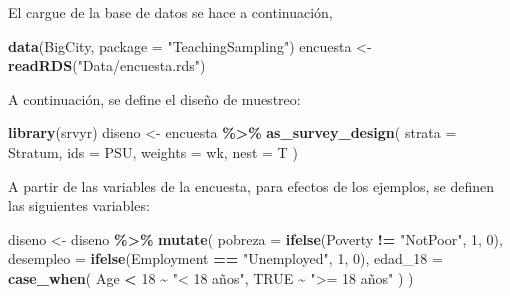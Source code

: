 \documentclass[
  spanish,
  12pt,
]{book}
\newenvironment{Shaded}{\begin{snugshade}}{\end{snugshade}}
\newcommand{\AttributeTok}[1]{\textcolor[rgb]{0.13,0.29,0.53}{#1}}
\newcommand{\ConstantTok}[1]{\textcolor[rgb]{0.56,0.35,0.01}{#1}}
\newcommand{\DecValTok}[1]{\textcolor[rgb]{0.00,0.00,0.81}{#1}}
\newcommand{\FunctionTok}[1]{\textcolor[rgb]{0.13,0.29,0.53}{\textbf{#1}}}
\newcommand{\NormalTok}[1]{#1}
\newcommand{\OtherTok}[1]{\textcolor[rgb]{0.56,0.35,0.01}{#1}}
\newcommand{\SpecialCharTok}[1]{\textcolor[rgb]{0.81,0.36,0.00}{\textbf{#1}}}
\newcommand{\StringTok}[1]{\textcolor[rgb]{0.31,0.60,0.02}{#1}}
\begin{document}
El cargue de la base de datos se hace a continuación,

\begin{Shaded}
\begin{Highlighting}[]
\FunctionTok{data}\NormalTok{(BigCity, }\AttributeTok{package =} \StringTok{"TeachingSampling"}\NormalTok{)}
\NormalTok{encuesta }\OtherTok{\textless{}{-}} \FunctionTok{readRDS}\NormalTok{(}\StringTok{"Data/encuesta.rds"}\NormalTok{)}
\end{Highlighting}
\end{Shaded}

A continuación, se define el diseño de muestreo:

\begin{Shaded}
\begin{Highlighting}[]
\FunctionTok{library}\NormalTok{(srvyr)}
\NormalTok{diseno }\OtherTok{\textless{}{-}}\NormalTok{ encuesta }\SpecialCharTok{\%\textgreater{}\%}
  \FunctionTok{as\_survey\_design}\NormalTok{(}
    \AttributeTok{strata =}\NormalTok{ Stratum,}
    \AttributeTok{ids =}\NormalTok{ PSU,}
    \AttributeTok{weights =}\NormalTok{ wk,}
    \AttributeTok{nest =}\NormalTok{ T}
\NormalTok{  )}
\end{Highlighting}
\end{Shaded}

A partir de las variables de la encuesta, para efectos de los ejemplos, se definen las siguientes variables:

\begin{Shaded}
\begin{Highlighting}[]
\NormalTok{diseno }\OtherTok{\textless{}{-}}\NormalTok{ diseno }\SpecialCharTok{\%\textgreater{}\%} \FunctionTok{mutate}\NormalTok{(}
  \AttributeTok{pobreza =} \FunctionTok{ifelse}\NormalTok{(Poverty }\SpecialCharTok{!=} \StringTok{"NotPoor"}\NormalTok{, }\DecValTok{1}\NormalTok{, }\DecValTok{0}\NormalTok{),}
  \AttributeTok{desempleo =} \FunctionTok{ifelse}\NormalTok{(Employment }\SpecialCharTok{==} \StringTok{"Unemployed"}\NormalTok{, }\DecValTok{1}\NormalTok{, }\DecValTok{0}\NormalTok{),}
  \AttributeTok{edad\_18 =} \FunctionTok{case\_when}\NormalTok{(}
\NormalTok{    Age }\SpecialCharTok{\textless{}} \DecValTok{18} \SpecialCharTok{\textasciitilde{}} \StringTok{"\textless{} 18 años"}\NormalTok{,}
    \ConstantTok{TRUE} \SpecialCharTok{\textasciitilde{}} \StringTok{"\textgreater{}= 18 años"}
\NormalTok{  )}
\NormalTok{)}
\end{Highlighting}
\end{Shaded}
\end{document}

